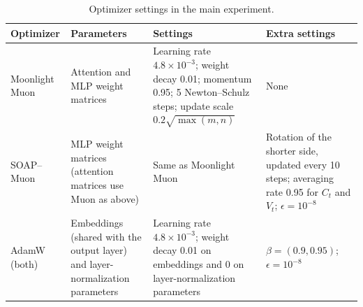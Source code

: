 \begin{table}[t]
\caption{Optimizer settings in the main experiment.}
\label{tab:optimizer-definitions}
\centering
\small
\begin{tabular}{p{} p{} p{} p{}}
\hline
Optimizer & Parameters & Settings & Extra settings \\
\hline
Moonlight Muon & Attention and MLP weight matrices & Learning rate $4.8\times10^{-3}$; weight decay 0.01; momentum 0.95; 5 Newton--Schulz steps; update scale $0.2\sqrt{\max(m,n)}$ & None \\
SOAP--Muon & MLP weight matrices (attention matrices use Muon as above) & Same as Moonlight Muon & Rotation of the shorter side, updated every 10 steps; averaging rate 0.95 for $C_t$ and $V_t$; $\epsilon=10^{-8}$ \\
AdamW (both) & Embeddings (shared with the output layer) and layer-normalization parameters & Learning rate $4.8\times10^{-3}$; weight decay 0.01 on embeddings and 0 on layer-normalization parameters & $\beta=(0.9,0.95)$; $\epsilon=10^{-8}$ \\
\hline
\end{tabular}
\end{table}

